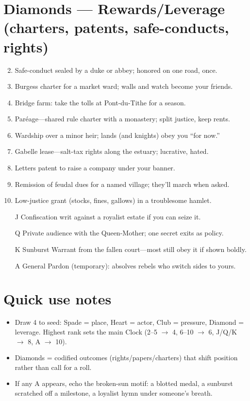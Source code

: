 \section*{Diamonds --- Rewards/Leverage (charters, patents, safe-conducts, rights)}
\begin{enumerate}
\setcounter{enumi}{1}
\item Safe-conduct sealed by a duke or abbey; honored on one road, once.
\item Burgess charter for a market ward; walls and watch become your friends.
\item Bridge farm: take the tolls at Pont-du-Tithe for a season.
\item Paréage---shared rule charter with a monastery; split justice, keep rents.
\item Wardship over a minor heir; lands (and knights) obey you ``for now.''
\item Gabelle lease---salt-tax rights along the estuary; lucrative, hated.
\item Letters patent to raise a company under your banner.
\item Remission of feudal dues for a named village; they'll march when asked.
\item Low-justice grant (stocks, fines, gallows) in a troublesome hamlet.
\item[J] Confiscation writ against a royalist estate if you can seize it.
\item[Q] Private audience with the Queen-Mother; one secret exits as policy.
\item[K] Sunburst Warrant from the fallen court---most still obey it if shown boldly.
\item[A] General Pardon (temporary): absolves rebels who switch sides to yours.
\end{enumerate}

\section*{Quick use notes}
\begin{itemize}
\item Draw 4 to seed: Spade = place, Heart = actor, Club = pressure, Diamond = leverage. Highest rank sets the main Clock (2--5 $\rightarrow$ 4, 6--10 $\rightarrow$ 6, J/Q/K $\rightarrow$ 8, A $\rightarrow$ 10).
\item Diamonds = codified outcomes (rights/papers/charters) that shift position rather than call for a roll.
\item If any A appears, echo the broken-sun motif: a blotted medal, a sunburst scratched off a milestone, a loyalist hymn under someone's breath.
\end{itemize}
